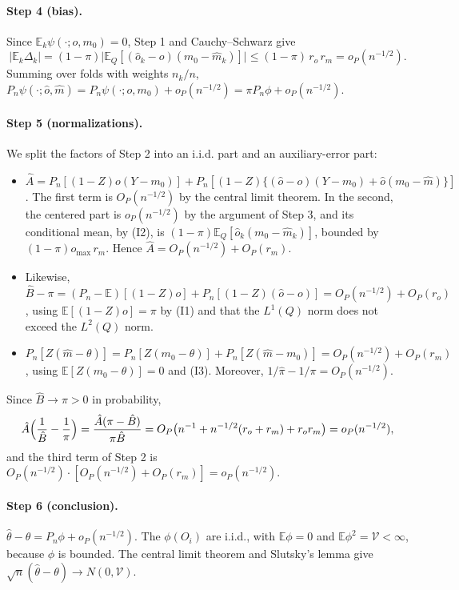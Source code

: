 \documentclass[twoside,11pt]{article}
\newcommand{\E}{\mathbb{E}}
\theoremstyle{plain}
\theoremstyle{definition}
\begin{document}
\paragraph{Step 4 (bias).} Since $\E_k\psi(\cdot;o,m_0)=0$, Step 1 and Cauchy--Schwarz give
\[
|\E_k\Delta_k|=(1-\pi)\bigl|\E_Q[(\hat o_k-o)(m_0-\hat m_k)]\bigr|\le(1-\pi)\,r_o\,r_m=o_P(n^{-1/2}).
\]
Summing over folds with weights $n_k/n$, $P_n\psi(\cdot;\hat o,\hat m)=P_n\psi(\cdot;o,m_0)+o_P(n^{-1/2})=\pi P_n\phi+o_P(n^{-1/2})$.

\paragraph{Step 5 (normalizations).} We split the factors of Step 2 into an i.i.d. part and an auxiliary-error part:
\begin{itemize}
  \item $\hat A=P_n[(1-Z)o(Y-m_0)]+P_n[(1-Z)\{(\hat o-o)(Y-m_0)+\hat o(m_0-\hat m)\}]$. The first term is $O_P(n^{-1/2})$ by the central limit theorem. In the second, the centered part is $o_P(n^{-1/2})$ by the argument of Step 3, and its conditional mean, by (I2), is $(1-\pi)\E_Q[\hat o_k(m_0-\hat m_k)]$, bounded by $(1-\pi)o_{\max}\,r_m$. Hence $\hat A=O_P(n^{-1/2})+O_P(r_m)$.
  \item Likewise, $\hat B-\pi=(P_n-\E)[(1-Z)o]+P_n[(1-Z)(\hat o-o)]=O_P(n^{-1/2})+O_P(r_o)$, using $\E[(1-Z)o]=\pi$ by (I1) and that the $L^1(Q)$ norm does not exceed the $L^2(Q)$ norm.
  \item $P_n[Z(\hat m-\theta)]=P_n[Z(m_0-\theta)]+P_n[Z(\hat m-m_0)]=O_P(n^{-1/2})+O_P(r_m)$, using $\E[Z(m_0-\theta)]=0$ and (I3). Moreover, $1/\hat\pi-1/\pi=O_P(n^{-1/2})$.
\end{itemize}
Since $\hat B\to\pi>0$ in probability,
\[
\hat A\Bigl(\frac1{\hat B}-\frac1\pi\Bigr)=\frac{\hat A(\pi-\hat B)}{\pi\hat B}=O_P\bigl(n^{-1}+n^{-1/2}(r_o+r_m)+r_or_m\bigr)=o_P(n^{-1/2}),
\]
and the third term of Step 2 is $O_P(n^{-1/2})\cdot[O_P(n^{-1/2})+O_P(r_m)]=o_P(n^{-1/2})$.

\paragraph{Step 6 (conclusion).} $\hat\theta-\theta=P_n\phi+o_P(n^{-1/2})$. The $\phi(O_i)$ are i.i.d., with $\E\phi=0$ and $\E\phi^2=\mathcal V<\infty$, because $\phi$ is bounded. The central limit theorem and Slutsky's lemma give $\sqrt n(\hat\theta-\theta)\to N(0,\mathcal V)$.
\end{document}
